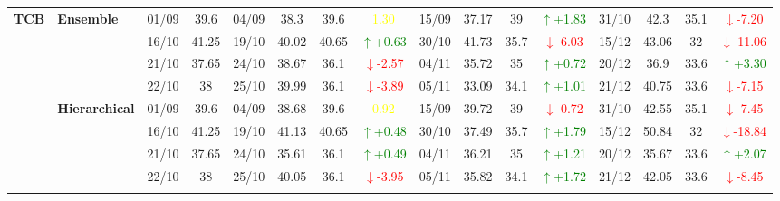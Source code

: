 \documentclass{ieeeaccess}
\begin{document}
{\begin{longtable}{llcc|cccc|cccc|cccc}
\multirow{12}{*}{\textbf{TCB}} 
& \textbf{Ensemble}
& 01/09 & 39.6 & 04/09 & 38.3 & 39.6 & \textcolor{yellow}{1.30} & 15/09 & 37.17 & 39 & \textcolor{green}{\(\uparrow\)+1.83} & 31/10 & 42.3 & 35.1 & \textcolor{red}{\(\downarrow\)-7.20} \\

&
& 16/10 & 41.25 & 19/10 & 40.02 & 40.65 & \textcolor{green}{\(\uparrow\)+0.63} & 30/10 & 41.73 & 35.7 & \textcolor{red}{\(\downarrow\)-6.03} & 15/12 & 43.06 & 32 & \textcolor{red}{\(\downarrow\)-11.06} \\

&
& 21/10 & 37.65 & 24/10 & 38.67 & 36.1 & \textcolor{red}{\(\downarrow\)-2.57} & 04/11 & 35.72 & 35 & \textcolor{green}{\(\uparrow\)+0.72} & 20/12 & 36.9 & 33.6 & \textcolor{green}{\(\uparrow\)+3.30} \\

&
& 22/10 & 38 & 25/10 & 39.99 & 36.1 & \textcolor{red}{\(\downarrow\)-3.89} & 05/11 & 33.09 & 34.1 & \textcolor{green}{\(\uparrow\)+1.01} & 21/12 & 40.75 & 33.6 & \textcolor{red}{\(\downarrow\)-7.15} \\
\cmidrule(lr){2-16}


& \textbf{Hierarchical}
& 01/09 & 39.6 & 04/09 & 38.68 & 39.6 & \textcolor{yellow}{0.92} & 15/09 & 39.72 & 39 & \textcolor{red}{\(\downarrow\)-0.72} & 31/10 & 42.55 & 35.1 & \textcolor{red}{\(\downarrow\)-7.45} \\

&
& 16/10 & 41.25 & 19/10 & 41.13 & 40.65 & \textcolor{green}{\(\uparrow\)+0.48} & 30/10 & 37.49 & 35.7 & \textcolor{green}{\(\uparrow\)+1.79} & 15/12 & 50.84 & 32 & \textcolor{red}{\(\downarrow\)-18.84} \\

&
& 21/10 & 37.65 & 24/10 & 35.61 & 36.1 & \textcolor{green}{\(\uparrow\)+0.49} & 04/11 & 36.21 & 35 & \textcolor{green}{\(\uparrow\)+1.21} & 20/12 & 35.67 & 33.6 & \textcolor{green}{\(\uparrow\)+2.07} \\

&
& 22/10 & 38 & 25/10 & 40.05 & 36.1 & \textcolor{red}{\(\downarrow\)-3.95} & 05/11 & 35.82 & 34.1 & \textcolor{green}{\(\uparrow\)+1.72} & 21/12 & 42.05 & 33.6 & \textcolor{red}{\(\downarrow\)-8.45} \\
\cmidrule(lr){2-16}




\end{longtable}}
\end{document}
